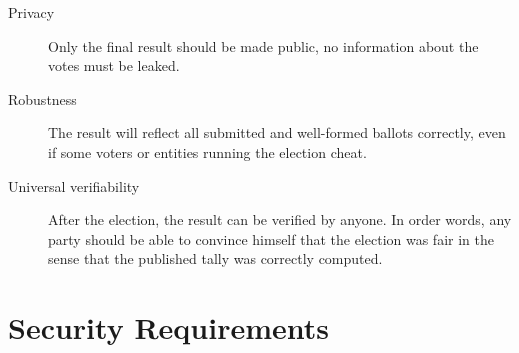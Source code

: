 \begin{description}
    \item[Privacy] Only the final result should be made public, no information
        about the votes must be leaked.

    \item[Robustness] The result will reflect all submitted and well-formed ballots
        correctly, even if some voters or entities running the election cheat.

    \item[Universal verifiability] After the election, the result can be verified by
        anyone. In order words, any party should be able to convince himself
        that the election was fair in the sense that the published tally was
        correctly computed.
\end{description}


\section{Security Requirements}

